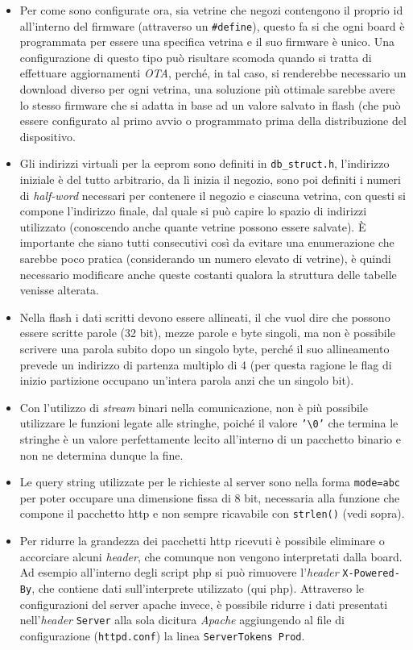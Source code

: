 \begin{itemize}
  \item Per come sono configurate ora, sia vetrine che negozi contengono il proprio id all'interno del firmware (attraverso un \texttt{\#define}), questo fa si che ogni board \`e programmata per essere una specifica vetrina e il suo firmware \`e unico. Una configurazione di questo tipo pu\`o risultare scomoda quando si tratta di effettuare aggiornamenti \textit{OTA}, perch\'e, in tal caso, si renderebbe necessario un download diverso per ogni vetrina, una soluzione pi\`u ottimale sarebbe avere lo stesso firmware che si adatta in base ad un valore salvato in flash (che pu\`o essere configurato al primo avvio o programmato prima della distribuzione del dispositivo.
  \item Gli indirizzi virtuali per la eeprom sono definiti in \texttt{db\_struct.h}, l'indirizzo iniziale \`e del tutto arbitrario, da l\`i inizia il negozio, sono poi definiti i numeri di \textit{half-word} necessari per contenere il negozio e ciascuna vetrina, con questi si compone l'indirizzo finale, dal quale si pu\`o capire lo spazio di indirizzi utilizzato (conoscendo anche quante vetrine possono essere salvate). \`E importante che siano tutti consecutivi cos\`i da evitare una enumerazione che sarebbe poco pratica (considerando un numero elevato di vetrine), \`e quindi necessario modificare anche queste costanti qualora la struttura delle tabelle venisse alterata.
  \item Nella flash i dati scritti devono essere allineati, il che vuol dire che possono essere scritte parole (32 bit), mezze parole e byte singoli, ma non \`e possibile scrivere una parola subito dopo un singolo byte, perch\'e il suo allineamento prevede un indirizzo di partenza multiplo di 4 (per questa ragione le flag di inizio partizione occupano un'intera parola anzi che un singolo bit).
  \item Con l'utilizzo di \textit{stream} binari nella comunicazione, non \`e pi\`u possibile utilizzare le funzioni legate alle stringhe, poich\'e il valore \texttt{'\textbackslash 0'} che termina le stringhe \`e un valore perfettamente lecito all'interno di un pacchetto binario e non ne determina dunque la fine.
  \item Le query string utilizzate per le richieste al server sono nella forma \texttt{mode=abc} per poter occupare una dimensione fissa di 8 bit, necessaria alla funzione che compone il pacchetto http e non sempre ricavabile con \texttt{strlen()} (vedi sopra).
  \item Per ridurre la grandezza dei pacchetti http ricevuti \`e possibile eliminare o accorciare alcuni \textit{header}, che comunque non vengono interpretati dalla board. Ad esempio all'interno degli script php si pu\`o rimuovere l'\textit{header} \texttt{X-Powered-By}, che contiene dati sull'interprete utilizzato (qui php). Attraverso le configurazioni del server apache invece, \`e possibile ridurre i dati presentati nell'\textit{header} \texttt{Server} alla sola dicitura \textit{Apache} aggiungendo al file di configurazione (\texttt{httpd.conf}) la linea \texttt{ServerTokens Prod}.

\end{itemize}
